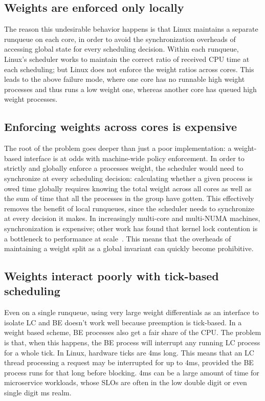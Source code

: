 \subsection{Weights are enforced only locally}\label{ss:problem:weights-local}

The reason this undesirable behavior happens is that Linux maintains a separate
runqueue on each core, in order to avoid the synchronization overheads of
accessing global state for every scheduling decision. Within each runqueue,
Linux's scheduler works to maintain the correct ratio of received CPU time at
each scheduling; but Linux does not enforce the weight ratios across cores. This
leads to the above failure mode, where one core has no runnable high weight
processes and thus runs a low weight one, whereas another core has queued high
weight processes.

\subsection{Enforcing weights across cores is
expensive}\label{ss:problem:cross-core-hard}

The root of the problem goes deeper than just a poor implementation: a
weight-based interface is at odds with machine-wide policy enforcement. In order
to strictly and globally enforce a processes weight, the scheduler would need to
synchronize at every scheduling decision: calculating whether a given process is
owed time globally requires knowing the total weight across all cores as well as
the sum of time that all the processes in the group have gotten. This
effectively removes the benefit of local runqueues, since the scheduler needs to
synchronize at every decision it makes. In increasingly multi-core and
multi-NUMA machines, synchronization is expensive; other work has found that
kernel lock contention is a bottleneck to performance at scale~\cite{afaas}.
This means that the overheads of maintaining a weight split as a global
invariant can quickly become prohibitive.


\subsection{Weights interact poorly with tick-based
scheduling}\label{ss:problem:quantum}

Even on a single runqueue, using very large weight differentials as an interface
to isolate LC and BE doesn't work well because preemption is tick-based. In a
weight based scheme, BE processes also get a fair share of the CPU. The problem
is that, when this happens, the BE process will interrupt any running LC process
for a whole tick. In Linux, hardware ticks are 4ms long. This means that an LC
thread processing a request may be interrupted for up to 4ms, provided the BE
process runs for that long before blocking. 4ms can be a large amount of time
for microservice workloads, whose SLOs are often in the low double digit or even
single digit ms realm.~\cite{in-the-plex, sigmaos}



